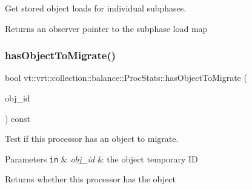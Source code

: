 Get stored object loads for individual subphases. 

\begin{DoxyReturn}{Returns}
an observer pointer to the subphase load map 
\end{DoxyReturn}
\mbox{\label{structvt_1_1vrt_1_1collection_1_1balance_1_1_proc_stats_a8ee38def0f38270f9b3dbbae19b027ce}} 
\subsubsection{\texorpdfstring{has\+Object\+To\+Migrate()}{hasObjectToMigrate()}}
{\footnotesize\ttfamily bool vt\+::vrt\+::collection\+::balance\+::\+Proc\+Stats\+::has\+Object\+To\+Migrate (\begin{DoxyParamCaption}\item[{\hyperlink{namespacevt_1_1vrt_1_1collection_1_1balance_a14c8d2c972f2913aa3f1636e5be0a120}{Element\+I\+D\+Type}}]{obj\+\_\+id }\end{DoxyParamCaption}) const}



Test if this processor has an object to migrate. 


\begin{DoxyParams}[1]{Parameters}
\mbox{\tt in}  & {\em obj\+\_\+id} & the object temporary ID\\
\hline
\end{DoxyParams}
\begin{DoxyReturn}{Returns}
whether this processor has the object 
\end{DoxyReturn}
\mbox{\label{structvt_1_1vrt_1_1collection_1_1balance_1_1_proc_stats_ad8a4cff0e1259002ed45b5c8f1b43d26}} 
